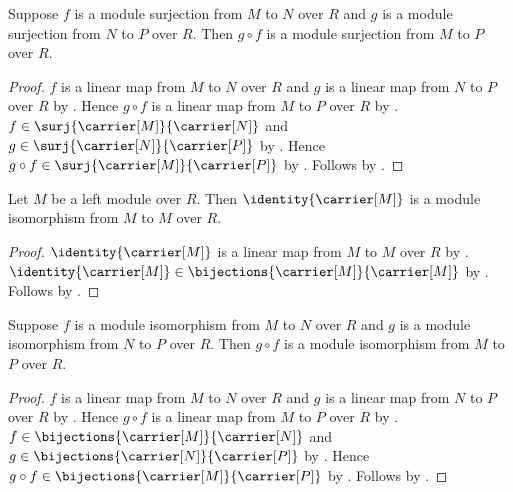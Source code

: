 \begin{theorem}\label{module_surjection_composition}
    Suppose $f$ is a module surjection from $M$ to $N$ over $R$ and
        $g$ is a module surjection from $N$ to $P$ over $R$.
    Then $g\circ f$ is a module surjection from $M$ to $P$ over $R$.
\end{theorem}
\begin{proof}
    $f$ is a linear map from $M$ to $N$ over $R$ and
        $g$ is a linear map from $N$ to $P$ over $R$ by
        .
    Hence $g\circ f$ is a linear map from $M$ to $P$ over $R$ by
        .
    $f\in\surj{\carrier[M]}{\carrier[N]}$ and
        $g\in\surj{\carrier[N]}{\carrier[P]}$ by
        .
    Hence $g\circ f\in\surj{\carrier[M]}{\carrier[P]}$ by
        .
    Follows by .
\end{proof}

\begin{proposition}\label{identity_module_isomorphism}
    Let $M$ be a left module over $R$.
    Then $\identity{\carrier[M]}$ is a module isomorphism from
        $M$ to $M$ over $R$.
\end{proposition}
\begin{proof}
    $\identity{\carrier[M]}$ is a linear map from $M$ to $M$ over $R$ by
        .
    $\identity{\carrier[M]}\in
        \bijections{\carrier[M]}{\carrier[M]}$ by
        .
    Follows by .
\end{proof}

\begin{theorem}\label{module_isomorphism_composition}
    Suppose $f$ is a module isomorphism from $M$ to $N$ over $R$ and
        $g$ is a module isomorphism from $N$ to $P$ over $R$.
    Then $g\circ f$ is a module isomorphism from $M$ to $P$ over $R$.
\end{theorem}
\begin{proof}
    $f$ is a linear map from $M$ to $N$ over $R$ and
        $g$ is a linear map from $N$ to $P$ over $R$ by
        .
    Hence $g\circ f$ is a linear map from $M$ to $P$ over $R$ by
        .
    $f\in\bijections{\carrier[M]}{\carrier[N]}$ and
        $g\in\bijections{\carrier[N]}{\carrier[P]}$ by
        .
    Hence $g\circ f\in\bijections{\carrier[M]}{\carrier[P]}$ by
        .
    Follows by .
\end{proof}

